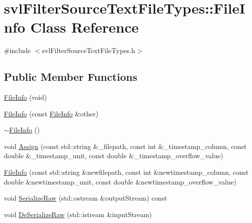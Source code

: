 \hypertarget{classsvl_filter_source_text_file_types_1_1_file_info}{\section{svl\-Filter\-Source\-Text\-File\-Types\-:\-:File\-Info Class Reference}
\label{classsvl_filter_source_text_file_types_1_1_file_info}
}


{\ttfamily \#include $<$svl\-Filter\-Source\-Text\-File\-Types.\-h$>$}

\subsection*{Public Member Functions}
\begin{DoxyCompactItemize}
\item 
\hyperlink{classsvl_filter_source_text_file_types_1_1_file_info_aee7fde8e1afcd0c9c2a6d3d876fcf590}{File\-Info} (void)
\item 
\hyperlink{classsvl_filter_source_text_file_types_1_1_file_info_a563aa39fc54dfa562b92b0a61b5634de}{File\-Info} (const \hyperlink{classsvl_filter_source_text_file_types_1_1_file_info}{File\-Info} \&other)
\item 
\hyperlink{classsvl_filter_source_text_file_types_1_1_file_info_ad7d9a3cadb8c4406295fc5094b2de766}{$\sim$\-File\-Info} ()
\item 
void \hyperlink{classsvl_filter_source_text_file_types_1_1_file_info_a49ea28f91a70e9d2062418ae970a935a}{Assign} (const std\-::string \&\-\_\-filepath, const int \&\-\_\-timestamp\-\_\-column, const double \&\-\_\-timestamp\-\_\-unit, const double \&\-\_\-timestamp\-\_\-overflow\-\_\-value)
\item 
\hyperlink{classsvl_filter_source_text_file_types_1_1_file_info_a1a157ed38fdd60d7c7bf7c550f638a92}{File\-Info} (const std\-::string \&newfilepath, const int \&newtimestamp\-\_\-column, const double \&newtimestamp\-\_\-unit, const double \&newtimestamp\-\_\-overflow\-\_\-value)
\item 
void \hyperlink{classsvl_filter_source_text_file_types_1_1_file_info_ab55fc1154f5a0026365614afae92bede}{Serialize\-Raw} (std\-::ostream \&output\-Stream) const 
\item 
void \hyperlink{classsvl_filter_source_text_file_types_1_1_file_info_ac78d84dc03fec64461d98f23b37c5fe5}{De\-Serialize\-Raw} (std\-::istream \&input\-Stream)
\item 

\end{DoxyCompactItemize}
